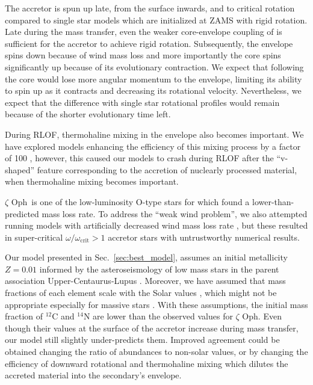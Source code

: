 \documentclass[twocolumn,twocolappendix,trackchanges]{aastex63}
\DeclareRobustCommand{\Secref}[1]{Sec.~\ref{#1}}
\newcommand{\zoph}{$\zeta$ Oph}
\begin{document}
The accretor is spun up late, from the surface inwards, and to
critical rotation compared to single star models which are initialized
at ZAMS with rigid rotation. Late during the mass transfer, even the
weaker core-envelope coupling of \cite{spruit:02} is sufficient for
the accretor to achieve rigid rotation. Subsequently, the envelope
spins down because of wind mass loss and more importantly the core
spins significantly up because of its evolutionary contraction. We
expect that following \cite{fuller:19} the core would lose more
angular momentum to the envelope, limiting its ability to spin up as
it contracts and decreasing its rotational velocity.
Nevertheless, we expect that the difference with single star
rotational profiles would remain because of the shorter evolutionary time left.

During RLOF, thermohaline mixing in the envelope also becomes
important. We have explored models enhancing the efficiency of this
mixing process by a factor of 100 \citep{schootemeijer:19}, however,
this caused our models to crash during RLOF after the ``v-shaped''
feature corresponding to the accretion of nuclearly processed
material, when thermohaline mixing becomes important.

\zoph\ is one of the low-luminosity O-type stars for which
\cite{marcolino:09} found a lower-than-predicted mass loss rate.
To address the ``weak wind problem'', we also attempted
running models with artificially decreased wind mass loss rate
\citep[e.g.,][]{renzo:17}, but these resulted in super-critical
$\omega/\omega_\mathrm{crit}>1$ accretor stars with untrustworthy
numerical results.

Our model presented in \Secref{sec:best_model}, assumes an initial
metallicity $Z=0.01$ informed by the asteroseismology of low mass
stars in the parent association Upper-Centaurus-Lupus
\citep[e.g.,][]{murphy:21}. Moreover, we have assumed that mass
fractions of each element scale with the Solar values
\citep{grevesse:98}, which might not be appropriate especially for
massive stars \citep[e.g.,][]{grasha:21}. With these assumptions, the
initial mass fraction of $^{12}\mathrm{C}$ and $^{14}\mathrm{N}$ are
lower than the observed values for \zoph. Even though their values at
the surface of the accretor increase during mass transfer, our model
still slightly under-predicts them. Improved agreement could be
obtained changing the ratio of abundances to non-solar values, or by
changing the efficiency of downward rotational and thermohaline mixing
which dilutes the accreted material into the secondary's envelope.
\end{document}
